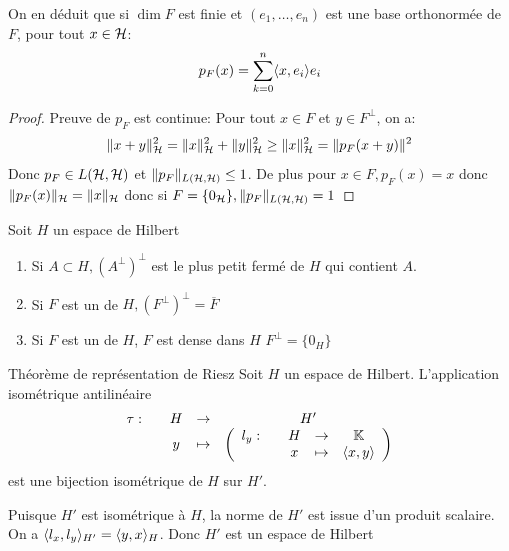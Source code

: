 \documentclass[]{report}
\begin{document}
    \begin{re}{}{}
        On en déduit que si $\dim F$ est finie et $(e_1,\ldots,e_n)$ est une base orthonormée de $F$, pour tout $x\in \mathcal{H}$: 
        \[p_F(x)=\sum_{k=0}^{n}\langle x,e_i \rangle e_i\]
    \end{re}

    \begin{proof}
        Preuve de $p_F$ est continue: Pour tout $x\in F$ et $y\in F^\perp$, on a:
        \[\lVert x+y \rVert_{\mathcal{H}}^2=\lVert x \rVert_{\mathcal{H}}^2+\lVert y \rVert_{\mathcal{H}}^2\ge \lVert x \rVert_{\mathcal{H}}^2=\lVert p_F(x+y) \rVert^2\]
        Donc $p_F\in L(\mathcal{H},\mathcal{H})$ et $\lVert p_F \rVert_{L(\mathcal{H},\mathcal{H})}\le 1$. De plus pour $x\in F, p_F(x)=x$ donc $\lVert p_F(x) \rVert_{\mathcal{H}}=\lVert x \rVert_{\mathcal{H}}$ donc si $F=\{0_{\mathcal{H}}\},\lVert p_F \rVert_{L(\mathcal{H},\mathcal{H})}=1$
    \end{proof}

    \begin{cor}{}{}
        Soit $H$ un espace de Hilbert
        \begin{enumerate}
            \item Si $A\subset H,(A^\perp)^\perp$ est le plus petit \sev fermé de $H$ qui contient $A$.
            \item Si $F$ est un \sev de $H,(F^\perp)^\perp=\overline{F}$
            \item Si $F$ est un \sev de $H$, $F$ est dense dans $H$ \ssi $F^\perp=\{0_H\}$
        \end{enumerate}
    \end{cor}

    \begin{tm}{Théorème de représentation de Riesz}{}
        Soit $H$ un espace de Hilbert. L'application isométrique antilinéaire
        \[\begin{array}{ccccc} \tau : & & H & \to & H' \\ & & y & \mapsto & \left(\begin{array}{ccccc} l_y : & & H & \to & \mathbb{K} \\ & & x & \mapsto & \langle x,y \rangle \end{array}\right) \end{array}\]
        est une bijection isométrique de $H$ sur $H'$.
    \end{tm}

    \begin{re}{}{}
        Puisque $H'$ est isométrique à $H$, la norme de $H'$ est issue d'un produit scalaire. On a $\langle l_x,l_y \rangle_{H'}=\langle y,x \rangle_H$. Donc $H'$ est un espace de Hilbert
    \end{re}
\end{document}
